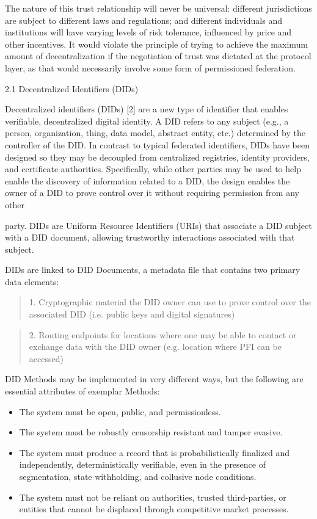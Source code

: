 \documentclass[
]{article}
\providecommand{\tightlist}{%
  \setlength{\itemsep}{0pt}\setlength{\parskip}{0pt}}
\begin{document}
The nature of this trust relationship will never be universal: different
jurisdictions are subject to different laws and regulations; and
different individuals and institutions will have varying levels of risk
tolerance, influenced by price and other incentives. It would violate
the principle of trying to achieve the maximum amount of
decentralization if the negotiation of trust was dictated at the
protocol layer, as that would necessarily involve some form of
permissioned federation.

2.1 Decentralized Identifiers (DIDs)

Decentralized identifiers (DIDs) {[}2{]} are a new type of identifier
that enables verifiable, decentralized digital identity. A DID refers to
any subject (e.g., a person, organization, thing, data model, abstract
entity, etc.) determined by the controller of the DID. In contrast to
typical federated identifiers, DIDs have been designed so they may be
decoupled from centralized registries, identity providers, and
certificate authorities. Specifically, while other parties may be used
to help enable the discovery of information related to a DID, the design
enables the owner of a DID to prove control over it without requiring
permission from any other

party. DIDs are Uniform Resource Identifiers (URIs) that associate a DID
subject with a DID document, allowing trustworthy interactions
associated with that subject.

DIDs are linked to DID Documents, a metadata file that contains two
primary data elements:

\begin{quote}
1. Cryptographic material the DID owner can use to prove control over
the associated DID (i.e. public keys and digital signatures)
\end{quote}

\begin{quote}
2. Routing endpoints for locations where one may be able to contact or
exchange data with the DID owner (e.g. location where PFI can be
accessed)
\end{quote}

DID Methods may be implemented in very different ways, but the following
are essential attributes of exemplar Methods:

\begin{itemize}
\tightlist
\item
  The system must be open, public, and permissionless.
\item
  The system must be robustly censorship resistant and tamper evasive.
\item
  The system must produce a record that is probabilistically finalized
  and independently, deterministically verifiable, even in the presence
  of segmentation, state withholding, and collusive node conditions.
\item
  The system must not be reliant on authorities, trusted third-parties,
  or entities that cannot be displaced through competitive market
  processes.
\end{itemize}
\end{document}
